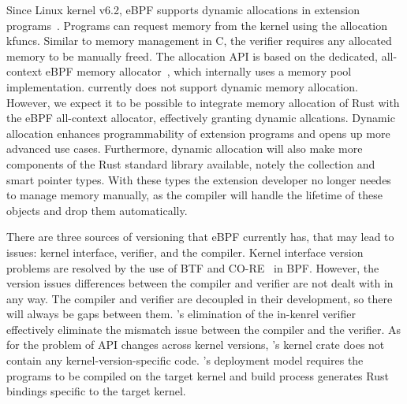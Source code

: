 Since Linux kernel v6.2, eBPF supports dynamic allocations in extension
    programs~\cite{Dwivedi-958cf2e273f0}.
Programs can request memory from the kernel using the allocation kfuncs.
Similar to memory management in C, the verifier requires any allocated memory
    to be manually freed.
The allocation API is based on the dedicated, all-context eBPF memory
    allocator~\cite{bpf-mempool-lwn}, which internally uses a memory pool
    implementation.
\projname{} currently does not support dynamic memory allocation.
However, we expect it to be possible to integrate memory allocation of Rust
    with the eBPF all-context allocator, effectively granting \projname{}
    dynamic allcations.
Dynamic allocation enhances programmability of extension programs and opens
    up more advanced use cases.
Furthermore, dynamic allocation will also make more components of the Rust
    standard library available, notely the collection and smart pointer types.
With these types the extension developer no longer needes to manage memory
    manually, as the compiler will handle the lifetime of these objects and
    drop them automatically.

There are three sources of versioning that eBPF currently has, that may lead to issues: kernel interface, verifier, and the compiler.
Kernel interface version problems are resolved by the use of BTF and CO-RE~\cite{bpf-core} in BPF.
However, the version issues differences between the compiler and verifier are not dealt
    with in any way.
The compiler and verifier are decoupled in their development, so there will
    always be gaps between them.
\projname{}'s elimination of the in-kenrel verifier effectively eliminate the
    mismatch issue between the compiler and the verifier.
As for the problem of API changes across kernel versions, \projname{}'s kernel
    crate does not contain any kernel-version-specific code.
\projname{}'s deployment model requires the programs to be compiled on the
    target kernel and build process generates Rust bindings specific to the
    target kernel.

